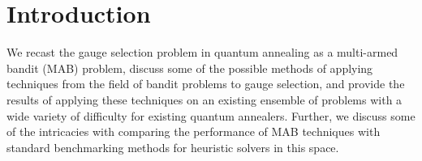 






% 




\section{Introduction}

We recast the gauge selection problem in quantum annealing as a multi-armed bandit (MAB) problem, discuss some of the possible methods of applying techniques from the field of bandit problems to gauge selection, and provide the results of applying these techniques on an existing ensemble of problems with a wide variety of difficulty for existing quantum annealers. Further, we discuss some of the intricacies with comparing the performance of MAB techniques with standard benchmarking methods for heuristic solvers in this space.

